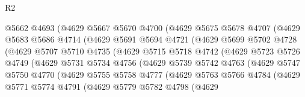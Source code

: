 \begin{lexlean}{R2}
\begin{coremodule}
                    @5662
                    @4693
                    (@4629
                      @5667
                      @5670
                      @4700
                      (@4629
                        @5675
                        @5678
                        @4707
                        (@4629
                          @5683
                          @5686
                          @4714
                          (@4629
                            @5691
                            @5694
                            @4721
                            (@4629
                              @5699
                              @5702
                              @4728
                              (@4629
                                @5707
                                @5710
                                @4735
                                (@4629
                                  @5715
                                  @5718
                                  @4742
                                  (@4629
                                    @5723
                                    @5726
                                    @4749
                                    (@4629
                                      @5731
                                      @5734
                                      @4756
                                      (@4629
                                        @5739
                                        @5742
                                        @4763
                                        (@4629
                                          @5747
                                          @5750
                                          @4770
                                          (@4629
                                            @5755
                                            @5758
                                            @4777
                                            (@4629
                                              @5763
                                              @5766
                                              @4784
                                              (@4629
                                                @5771
                                                @5774
                                                @4791
                                                (@4629
                                                  @5779
                                                  @5782
                                                  @4798
                                                  (@4629

\end{coremodule}
\end{lexlean}
